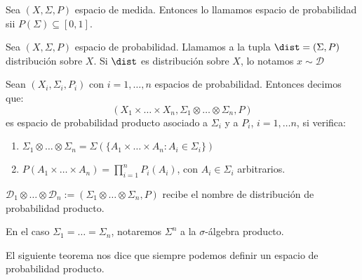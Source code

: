 \begin{definition}
 Sea $(X, \Sigma, P)$ espacio de medida. Entonces lo llamamos espacio de probabilidad sii $P(\Sigma)\subseteq [0,1]$.
\end{definition}


\begin{definition}
 Sea $(X, \Sigma, P)$ espacio de probabilidad. Llamamos a la tupla $\dist = (\Sigma,P)$ distribución sobre $X$. 
 Si $\dist$ es distribución sobre $X$, lo notamos $x\sim \mathcal{D}$
\end{definition}

\begin{definition}
 Sean $(X_i, \Sigma_i, P_i)$ con $i=1,\ldots, n$ espacios de probabilidad. Entonces decimos que:
 \[(X_1 \times \ldots \times X_n, \Sigma_1 \otimes \ldots \otimes \Sigma_n, P)\] es
 espacio de probabilidad producto asociado a $\Sigma_i$ y a $P_i$, $i=1, \ldots n$, si verifica:
 
 \begin{enumerate}[i]
  \item $\Sigma_1 \otimes \ldots \otimes \Sigma_n = \Sigma\left(\{A_1 \times \ldots \times A_n: A_i\in \Sigma_i\}\right)$
  \item $P(A_1 \times \ldots \times A_n) = \prod_{i=1}^n P_i(A_i)$, con $A_i\in \Sigma_i$ arbitrarios.
 \end{enumerate}
 
 $\mathcal{D}_1 \otimes \ldots \otimes \mathcal{D}_n := (\Sigma_1 \otimes \ldots \otimes \Sigma_n, P)$ recibe 
 el nombre de distribución de probabilidad producto.
 
 En el caso $\Sigma_1 = \ldots = \Sigma_n$, notaremos $\Sigma^n$ a la $\sigma$-álgebra producto.
\end{definition}

El siguiente teorema nos dice que siempre podemos definir un espacio de probabilidad producto.

